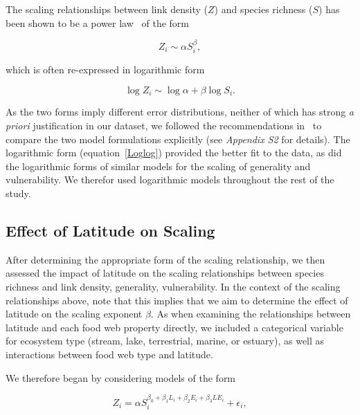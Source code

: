 \documentclass[12pt]{article}
\begin{document}
\begin{spacing}{1.0}
    The scaling relationships between link density ($Z$) and species richness ($S$)
    has been shown to be a power law~\citep{Riede2010} of the form 

    \begin{equation}
    \label{Power}
    Z_{i} \sim \alpha S_{i}^{\beta}  ,
    \end{equation}

    \noindent which is often re-expressed in logarithmic form 

    \begin{equation}
    \label{Loglog}
    \log{Z_{i}} \sim \log{\alpha} + \beta\log{S_{i}}  .
    \end{equation}

    \noindent As the two forms imply different error distributions, neither of which has strong
    \emph{a priori} justification in our dataset, we followed the recommendations in~\citet{Xiao2011}
    to compare the two model formulations explicitly (see \emph{Appendix S2} for details). 
    The logarithmic form (equation~\ref{Loglog}) provided the better fit to the data,
    as did the logarithmic forms of similar models for the scaling of generality and vulnerability. 
    We therefor used logarithmic models throughout the rest of the study.


  \subsection*{Effect of Latitude on Scaling}


    After determining the appropriate form of the scaling relationship, we
    then assessed the impact of latitude on the scaling relationships between
    species richness and  link density, generality, vulnerability. In the
    context of the scaling relationships above, note  that this implies that
    we aim to determine the effect of latitude on the scaling exponent
    $\beta$. As when examining the relationships between latitude and each
    food  web property directly, we included a categorical variable for
    ecosystem type (stream, lake,  terrestrial, marine, or estuary), as well
    as interactions between food web type and latitude.


    We therefore began by considering models of the form

    \begin{equation}
    \label{PowerLat}
    Z_{i}=\alpha S_{i}^{\beta_{0}+\beta_{1}L_{i}+\beta_{2}E_{i}+\beta_{3}LE_{i}} + \epsilon_{i} ,
    \end{equation}


\end{spacing}
\end{document}
